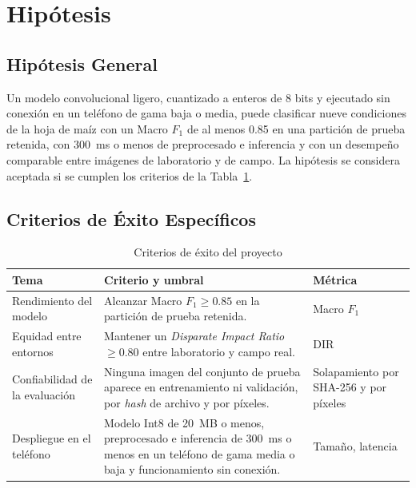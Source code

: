\section{Hip\'otesis}

\subsection{Hip\'otesis General}
Un modelo convolucional ligero, cuantizado a enteros de 8 bits y ejecutado sin conexi\'on en un tel\'efono de gama baja o media, puede clasificar nueve condiciones de la hoja de ma\'iz con un Macro $F_1$ de al menos 0.85 en una partici\'on de prueba retenida, con 300~ms o menos de preprocesado e inferencia y con un desempe\~no comparable entre im\'agenes de laboratorio y de campo. La hip\'otesis se considera aceptada si se cumplen los criterios de la Tabla~\ref{tab:criterios_exito}.

\subsection{Criterios de \'Exito Espec\'ificos}

\begin{table}[H]
\caption{Criterios de \'exito del proyecto}
\label{tab:criterios_exito}
\centering
\small
\begin{singlespace}
\begin{tabularx}{\textwidth}{>{\raggedright\arraybackslash}p{3.4cm}>{\raggedright\arraybackslash}X>{\raggedright\arraybackslash}p{3.2cm}}
\toprule
\textbf{Tema} & \textbf{Criterio y umbral} & \textbf{M\'etrica} \\
\midrule
Rendimiento del modelo & Alcanzar Macro $F_1 \ge 0.85$ en la partici\'on de prueba retenida. & Macro $F_1$ \\
Equidad entre entornos & Mantener un \textit{Disparate Impact Ratio} $\ge 0.80$ entre laboratorio y campo real. & DIR \\
Confiabilidad de la evaluaci\'on & Ninguna imagen del conjunto de prueba aparece en entrenamiento ni validaci\'on, por \textit{hash} de archivo y por p\'ixeles. & Solapamiento por SHA-256 y por p\'ixeles \\
Despliegue en el tel\'efono & Modelo Int8 de 20~MB o menos, preprocesado e inferencia de 300~ms o menos en un tel\'efono de gama media o baja y funcionamiento sin conexi\'on. & Tama\~no, latencia \\
\bottomrule
\end{tabularx}
\end{singlespace}
\end{table}

